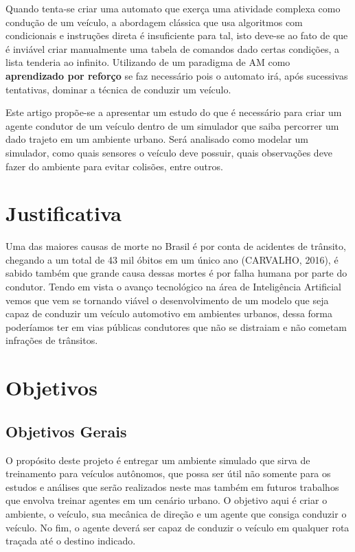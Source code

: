 Quando tenta-se criar uma automato que exerça uma atividade complexa como condução de um veículo, a abordagem clássica que usa algoritmos com condicionais e instruções direta é insuficiente para tal, isto deve-se ao fato de que é inviável criar manualmente uma tabela de comandos dado certas condições, a lista tenderia ao infinito. Utilizando de um paradigma de AM como \textbf{aprendizado por reforço} se faz necessário pois o automato irá, após sucessivas tentativas, dominar a técnica de conduzir um veículo.

Este artigo propõe-se a apresentar um estudo do que é necessário para criar um agente condutor de um veículo dentro de um simulador que saiba percorrer um dado trajeto em um ambiente urbano. Será analisado como modelar um simulador, como quais sensores o veículo deve possuir, quais observações deve fazer do ambiente para evitar colisões, entre outros.


\section*{Justificativa}\label{sec:justificativa}
Uma das maiores causas de morte no Brasil é por conta de acidentes de trânsito, chegando a um total de 43 mil óbitos em um único ano (CARVALHO, 2016), é sabido também que grande causa dessas mortes é por falha humana por parte do condutor. Tendo em vista o avanço tecnológico na área de Inteligência Artificial vemos que vem se tornando viável o desenvolvimento de um modelo que seja capaz de conduzir um veículo automotivo em ambientes urbanos, dessa forma poderíamos ter em vias públicas condutores que não se distraiam e não cometam infrações de trânsitos.


\section*{Objetivos}\label{sec:objetivos}
\subsection*{Objetivos Gerais}
O propósito deste projeto é entregar um ambiente simulado que sirva de treinamento para veículos autônomos, que possa ser útil não somente para os estudos e análises que serão realizados neste mas também em futuros trabalhos que envolva treinar agentes em um cenário urbano. O objetivo aqui é criar o ambiente, o veículo, sua mecânica de direção e um agente que consiga conduzir o veículo. No fim, o agente deverá ser capaz de conduzir o veículo em qualquer rota traçada até o destino indicado.

